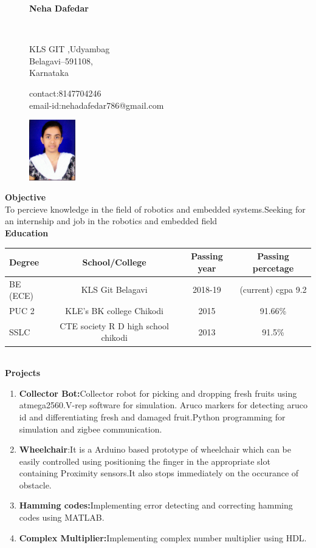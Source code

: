 \documentclass{article}
\begin{document}
\begin{figure}
\begin{center}
\textbf{Neha Dafedar}
\end{center}
\hrulefill\\
\begin{minipage}[t]{0.5\textwidth}
KLS GIT ,Udyambag\\
Belagavi--591108,\\
Karnataka\\
\end{minipage}
\begin{minipage}[t]{0.5\textwidth}
\raggedleft
contact:8147704246\\
email-id:nehadafedar786@gmail.com\\
\end{minipage}


\raggedleft
\includegraphics[width=20mm]{photo.jpg}
\end{figure}
\textbf{Objective}\\
 To percieve knowledge in the field of robotics and embedded systems.Seeking for an internship and job in the robotics and embedded field\\[0.5 cm]
\textbf{Education}\\[0.5cm]
\begin{tabular}{ l | c  | c | c | }
\textbf{Degree} & \textbf{School/College} & \textbf{Passing year} & \textbf{Passing percetage}\\ \hline
BE (ECE)& KLS Git Belagavi & 2018-19 & (current) cgpa 9.2\\ \hline
PUC 2 & KLE's BK college Chikodi & 2015 &  91.66\% \\ \hline
SSLC  & CTE society R D high school chikodi & 2013 & 91.5\% \\ \hline

\end{tabular}\\[0.5cm]
\textbf{Projects}\\[0.1cm]
\begin{enumerate}
\item\textbf{ Collector Bot:}Collector robot for picking and dropping fresh fruits using atmega2560.V-rep
software for simulation. Aruco markers for detecting aruco id and
differentiating fresh and damaged fruit.Python programming for simulation
and zigbee communication.
\item\textbf{Wheelchair}:It is a Arduino based prototype of wheelchair which can be easily controlled
using positioning the finger in the appropriate slot containing Proximity sensors.It also stops immediately
on the occurance of obstacle.
\item\textbf{Hamming codes:}Implementing error detecting and correcting hamming codes using MATLAB.
\item\textbf{Complex Multiplier:}Implementing complex number multiplier using HDL.\\[0.5cm]
\end{enumerate}
\end{document}
